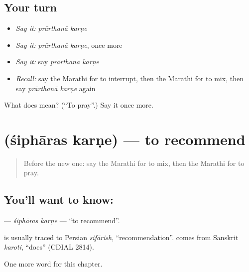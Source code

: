 \subsection*{Your turn}
\begin{itemize}
\raggedright
  \item \emph{Say it:} \emph{prārthanā karṇe}
  \item \emph{Say it:} \emph{prārthanā karṇe}, once more
  \item \emph{Say it:} say \emph{prārthanā karṇe}
  \item \emph{Recall:} say the Marathi for to interrupt, then the Marathi for to mix, then say \emph{prārthanā karṇe} again
\end{itemize}

\begin{tcolorbox}[breakable,colback=teal!4,colframe=teal!35!black,title={Before you move on}]
What does   mean? (\textquotedblleft{}To pray\textquotedblright{}.) Say it once more.
\end{tcolorbox}
\section[\texorpdfstring{\mr{शिफारस} \mr{करणे} (śiphāras karṇe)}{शिफारस करणे (śiphāras karṇe)}]{  (śiphāras karṇe) — to recommend}

\label{lesson:MR-C255-sipharas-karne}



\begin{quote}
Before the new one: say the Marathi for to mix, then the Marathi for to pray.
\end{quote}

\subsection*{You'll want to know:  }
\textbf{ } — \emph{śiphāras karṇe} — \textquotedblleft{}to recommend\textquotedblright{}.

\begin{cousinweb}
\textbf{} is usually traced to Persian \emph{sifārish}, \textquotedblleft{}recommendation\textquotedblright{}. \textbf{} comes from Sanskrit \emph{karoti}, \textquotedblleft{}does\textquotedblright{} (CDIAL 2814).
\end{cousinweb}

\begin{grammarlens}[title={What you've built}]
One more word for this chapter.
\end{grammarlens}

